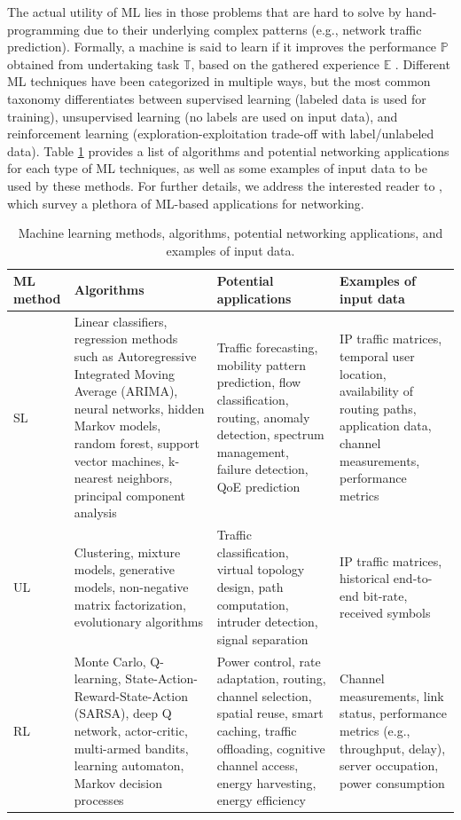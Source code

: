 \documentclass{article}
\begin{document}
The actual utility of ML lies in those problems that are hard to solve by hand-programming due to their underlying complex patterns (e.g., network traffic prediction). Formally, a machine is said to learn if it improves the performance $\mathbb{P}$ obtained from undertaking task $\mathbb{T}$, based on the gathered experience $\mathbb{E}$ \cite{mitchell1997machine}. Different ML techniques have been categorized in multiple ways, but the most common taxonomy differentiates between supervised learning (labeled data is used for training), unsupervised learning (no labels are used on input data), and reinforcement learning (exploration-exploitation trade-off with label/unlabeled data). Table \ref{table:ml_taxonomy} provides a list of algorithms and potential networking applications for each type of ML techniques, as well as some examples of input data to be used by these methods. For further details, we address the interested reader to \cite{jiang2016machine, zhang2019deep, usama2019unsupervised}, which survey a plethora of ML-based applications for networking.

\begin{table}[ht!]
\caption{Machine learning methods, algorithms, potential networking applications, and examples of input data.}
\label{table:ml_taxonomy}
\centering
\scriptsize
\begin{tabular}{|p{}|p{}|p{}|p{}|}
\hline
\textbf{ML method} & \textbf{Algorithms} & \textbf{Potential applications} & \textbf{Examples of input data} \\\hline
SL & Linear classifiers, regression methods such as Autoregressive Integrated Moving Average (ARIMA), neural networks, hidden Markov models, random forest, support vector machines, k-nearest neighbors, principal component analysis &Traffic forecasting, mobility pattern prediction, flow classification, routing, anomaly detection, spectrum management, failure detection, QoE prediction & IP traffic matrices, temporal user location, availability of routing paths, application data, channel measurements, performance metrics \\\hline
UL & Clustering, mixture models, generative models, non-negative matrix factorization, evolutionary algorithms & Traffic classification, virtual topology design, path computation, intruder detection, signal separation& IP traffic matrices, historical end-to-end bit-rate, received symbols \\\hline
RL & Monte Carlo, Q-learning, State-Action-Reward-State-Action (SARSA), deep Q network, actor-critic, multi-armed bandits, learning automaton, Markov decision processes & Power control, rate adaptation, routing, channel selection, spatial reuse, smart caching, traffic offloading, cognitive channel access, energy harvesting, energy efficiency & Channel measurements, link status, performance metrics (e.g., throughput, delay), server occupation, power consumption \\\hline
\end{tabular}
\end{table}
\end{document}
